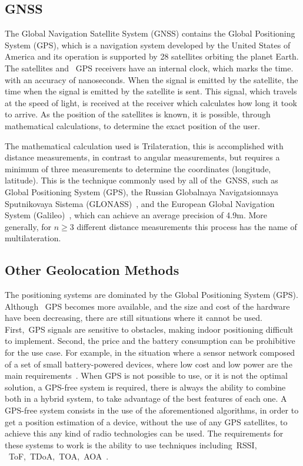 \newpage
\subsection{GNSS} %
\label{sec:GNSS}


The Global Navigation Satellite System (\gls{GNSS}) contains the Global Positioning System (\gls{GPS}), which is a navigation system developed by the United States of America and its operation is supported by 28 satellites orbiting the planet Earth. The satellites and ~\gls{GPS} receivers have an internal clock, which marks the time. with an accuracy of nanoseconds. When the signal is emitted by the satellite, the time when the signal is emitted by the satellite is sent. This signal, which travels at the speed of light, is received at the receiver which calculates how long it took to arrive. As the position of the satellites is known, it is possible, through mathematical calculations, to determine the exact position of the user. 

The mathematical calculation used is Trilateration, this is  accomplished  with distance measurements, in contrast to angular measurements, but requires a minimum of three  measurements to determine the coordinates (longitude, latitude). This is the technique commonly used by all of the~\gls{GNSS}, such as Global Positioning System (\gls{GPS}), the Russian Globalnaya Navigatsionnaya Sputnikovaya Sistema (GLONASS)~\cite{Ivanov1992}, and the European Global Navigation System (Galileo)~\cite{Galileo}, which can achieve an average precision of 4.9m. More generally, for $n \geq 3$ different distance measurements this process has the name of multilateration.

\subsection{Other Geolocation Methods} %
\label{sec:other_Geolocation}

The positioning systems are dominated by the Global Positioning System (\gls{GPS}). Although ~\gls{GPS} becomes more available, and the size and cost of the hardware have been decreasing, there are still situations where it cannot be used. First,~\gls{GPS} signals are sensitive to obstacles, making indoor positioning difficult to implement. Second, the price and the battery consumption can be prohibitive for the use case. For example, in the situation where a sensor network composed of a set of small battery-powered devices, where low cost and low power are the  main requirements~\cite{GFBriilwdis2005}. When \gls{GPS} is not possible to use, or it is not the optimal solution, a GPS-free system is required, there is always the ability to combine both in a hybrid system, to take advantage of the best features of each one.
A GPS-free system consists in the use of the aforementioned algorithms, in order to get a position estimation of a device, without the use of any \gls{GPS} satellites, to achieve this any kind of radio technologies can be used. The requirements for these systems to work is the ability to use techniques including~\gls{RSSI}, ~\gls{ToF},~\gls{TDoA},~\gls{TOA},~\gls{AOA}~\cite{GFZhu2010}.

